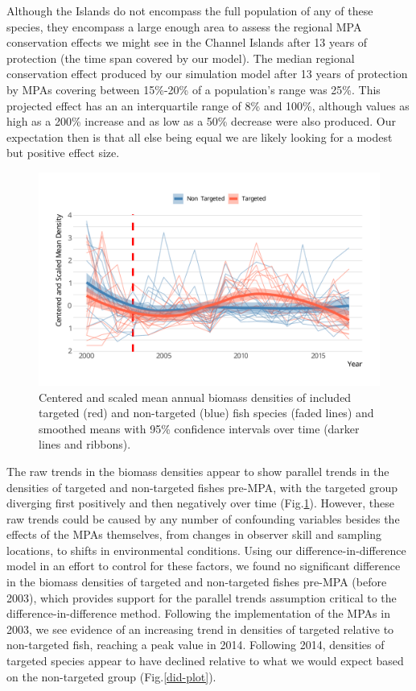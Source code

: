 \documentclass[9pt,twocolumn,twoside,lineno]{pnas-new}
\begin{document}
Although the Islands do not encompass the full population of any of
these species, they encompass a large enough area to assess the regional
MPA conservation effects we might see in the Channel Islands after 13
years of protection (the time span covered by our model). The median
regional conservation effect produced by our simulation model after 13
years of protection by MPAs covering between 15\%-20\% of a population's
range was 25\%. This projected effect has an an interquartile range of
8\% and 100\%, although values as high as a 200\% increase and as low as
a 50\% decrease were also produced. Our expectation then is that all
else being equal we are likely looking for a modest but positive effect
size.

\begin{figure}%
  \centering
  \includegraphics[width=1\linewidth]{figs/pop-trends.pdf}
  \caption{Centered and scaled mean annual biomass densities of included targeted (red) and non-targeted (blue) fish species (faded lines) and smoothed means with 95\% confidence intervals over time (darker lines and ribbons).}
  \label{pop-trends}
\end{figure}

The raw trends in the biomass densities appear to show parallel trends
in the densities of targeted and non-targeted fishes pre-MPA, with the
targeted group diverging first positively and then negatively over time
(Fig.\ref{pop-trends}). However, these raw trends could be caused by any
number of confounding variables besides the effects of the MPAs
themselves, from changes in observer skill and sampling locations, to
shifts in environmental conditions. Using our difference-in-difference
model in an effort to control for these factors, we found no significant
difference in the biomass densities of targeted and non-targeted fishes
pre-MPA (before 2003), which provides support for the parallel trends
assumption critical to the difference-in-difference method. Following
the implementation of the MPAs in 2003, we see evidence of an increasing
trend in densities of targeted relative to non-targeted fish, reaching a
peak value in 2014. Following 2014, densities of targeted species appear
to have declined relative to what we would expect based on the
non-targeted group (Fig.\ref{did-plot}).
\end{document}
